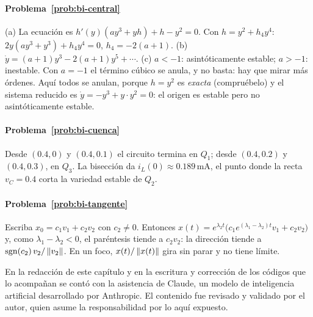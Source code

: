 \paragraph{Problema~\ref{prob:bi-central}}
(a) La ecuación es $h'(y)(ay^3+yh)+h-y^2=0$. Con $h=y^2+h_4y^4$: $2y(ay^3+y^3)+h_4y^4=0$, $h_4=-2(a+1)$. (b) $\dot y=(a+1)y^3-2(a+1)y^5+\cdots$. (c) $a<-1$: asintóticamente estable; $a>-1$: inestable. Con $a=-1$ el término cúbico se anula, y no basta: hay que mirar más órdenes. Aquí todos se anulan, porque $h=y^2$ es \emph{exacta} (compruébelo) y el sistema reducido es $\dot y=-y^3+y\cdot y^2=0$: el origen es estable pero no asintóticamente estable.

\paragraph{Problema~\ref{prob:bi-cuenca}}
Desde $(0.4,0)$ y $(0.4,0.1)$ el circuito termina en $Q_1$; desde $(0.4,0.2)$ y $(0.4,0.3)$, en $Q_3$. La bisección da $i_L(0)\approx0.189$\,mA, el punto donde la recta $v_C=0.4$ corta la variedad estable de $Q_2$.

\paragraph{Problema~\ref{prob:bi-tangente}}
Escriba $x_0=c_1v_1+c_2v_2$ con $c_2\neq0$. Entonces $x(t)=e^{\lambda_2t}\bigl(c_1e^{(\lambda_1-\lambda_2)t}v_1+c_2v_2\bigr)$ y, como $\lambda_1-\lambda_2<0$, el paréntesis tiende a $c_2v_2$: la dirección tiende a $\operatorname{sgn}(c_2)\,v_2/\left\lVert v_2\right\rVert$. En un foco, $x(t)/\left\lVert x(t)\right\rVert$ gira sin parar y no tiene límite.

\respuestaspausas

\begin{parallevar}
En la redacción de este capítulo y en la escritura y corrección de los códigos que lo acompañan se contó con la asistencia de Claude, un modelo de inteligencia artificial desarrollado por Anthropic. El contenido fue revisado y validado por el autor, quien asume la responsabilidad por lo aquí expuesto.
\end{parallevar}
